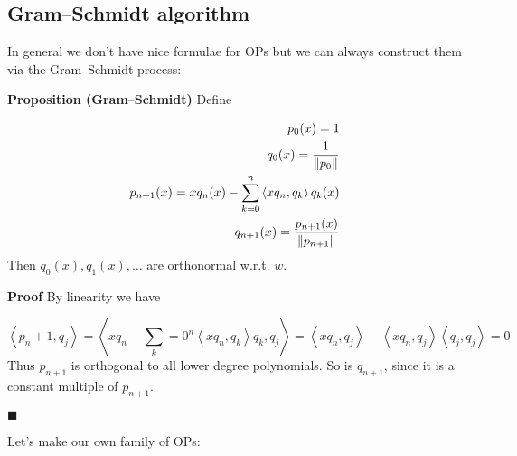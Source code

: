 \documentclass[12pt,a4paper]{article}
\def\ip<#1>{\left\langle{#1}\right\rangle}
\def\norm#1{\left\| #1 \right\|}
\def\endash{–}
\begin{document}
\subsection{Gram\ensuremath{\endash}Schmidt algorithm}
In general we don't have nice formulae for OPs but we can always construct them via the Gram\ensuremath{\endash}Schmidt process:

\textbf{Proposition (Gram\ensuremath{\endash}Schmidt)} Define


\begin{align*}
p_0(x) = 1 \\
q_0(x) = {1 \over \norm{p_0}}\\
p_{n+1}(x) = x q_n(x) - \sum_{k=0}^n \ip<x q_n, q_k> q_k(x)\\
q_{n+1}(x) = {p_{n+1}(x) \over \norm{p_{n+1}}}
\end{align*}
Then $q_0(x), q_1(x), \ldots$ are orthonormal w.r.t. $w$.

\textbf{Proof} By linearity we have

\[
\ip<p_{n+1}, q_j> = \ip<x q_n - \sum_{k=0}^n {\ip<x q_n, q_k>} q_k, q_j> = \ip<x q_n, q_j> - \ip<x q_n, q_j> \ip<q_j,q_j> = 0
\]
Thus $p_{n+1}$ is orthogonal to all lower degree polynomials. So is $q_{n+1}$, since it is a constant multiple of $p_{n+1}$.

\ensuremath{\blacksquare}

Let's make our own family of OPs:
\end{document}
